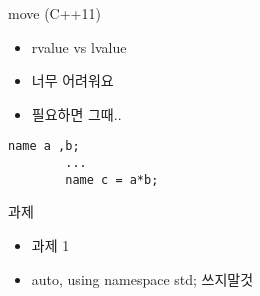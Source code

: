 \documentclass[10pt]{beamer}
\begin{document}
\begin{frame}[fragile] {move (C++11)}
    \begin{itemize}
        \item rvalue vs lvalue
        \item 너무 어려워요
        \item 필요하면 그때..
    \end{itemize}
    \begin{lstlisting}[style = CppStyle]
        name a ,b;
        ...
        name c = a*b;
    \end{lstlisting}
\end{frame}

\begin{frame}{과제}
    \begin{itemize}
        \item 과제 1
        \item auto, using namespace std; 쓰지말것
    \end{itemize}
\end{frame}    
\end{document}
